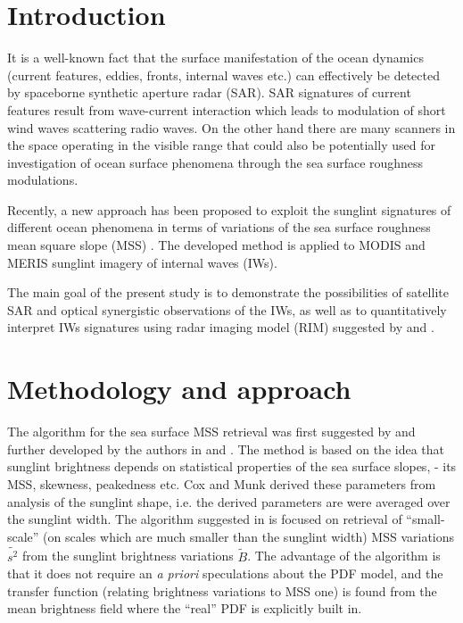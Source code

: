 \documentclass[draft,grl]{agutex}
\begin{document}
\begin{article}

%
%


\section{Introduction}

It is a well-known fact that the surface manifestation of the ocean dynamics (current features, eddies, fronts, internal waves etc.) can effectively be detected by spaceborne synthetic aperture radar (SAR). SAR signatures of current features result from wave-current interaction which leads to modulation of short wind waves scattering radio waves. On the other hand there are many scanners in the space operating in the visible range that could also be potentially used for investigation of ocean surface phenomena through the sea surface roughness modulations.

Recently, a new approach has been proposed to exploit the sunglint signatures of different ocean phenomena in terms of variations of the sea surface roughness mean square slope (MSS) \citep{Kudryavtsev2012a}. The developed method is applied to MODIS and MERIS sunglint imagery of internal waves (IWs). 

The main goal of the present study is to demonstrate the possibilities of satellite SAR and optical synergistic observations of the IWs, as well as to quantitatively interpret IWs signatures using radar imaging model (RIM) suggested by \cite{Kudryavtsev2005} and \cite{Johannessen2005}.


\section{Methodology and approach}

The algorithm for the sea surface MSS retrieval was first suggested by \cite{Myasoedov2010a} and further developed by the authors in \citep{Kudryavtsev2012a} and \citep{Kudryavtsev2012b}. The method is based on the idea that sunglint brightness depends on statistical properties of the sea surface slopes, - its MSS, skewness, peakedness etc. Cox and Munk \cite{Cox1954} derived these parameters from analysis of the sunglint shape, i.e. the derived parameters are were averaged over the sunglint width. The algorithm suggested in \citep{Kudryavtsev2012a} is focused on retrieval of ``small-scale'' (on scales which are much smaller than the sunglint width) MSS variations $\tilde{s^2}$ from the sunglint brightness variations $\tilde{B}$. The advantage of the algorithm is that it does not require an \textit{a priori} speculations about the PDF model, and the transfer function (relating brightness variations to MSS one) is found from the mean brightness field where the ``real'' PDF is explicitly built in.



\end{article}
\end{document}
